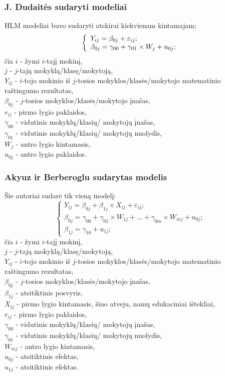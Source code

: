 \documentclass[utf8,hyperref={unicode,pdftex}]{beamer}
\begin{document}
\begin{frame}
\frametitle{J. Dudaitės sudaryti modeliai}
HLM modeliai buvo sudaryti atskirai kiekvienam kintamajam:
\[ \left\{
  \begin{array}{l l}
    Y_{ij} = \beta_{0j}+\varepsilon_{ij}; \\
    \beta_{0j} = \gamma_{00} + \gamma_{01}\times W_{j}+u_{0j};
  \end{array} \right.\]
\small
čia $i$ - žymi $i$-tajį mokinį,\\
$j$ - $j$-tają mokyklą/klasę/mokytoją,\\
$Y_{ij}$ - $i$-tojo mokinio iš $j$-tosios mokyklos/klasės/mokytojo matematinio raštingumo rezultatas,\\
$\beta_{0j}$ - $j$-tosios mokyklos/klasės/mokytojo įnašas,\\
$r_{ij}$ - pirmo lygio paklaidos,\\
$\gamma_{00}$ - vidutinis mokyklų/klasių/ mokytojų įnašas,\\
$\gamma_{01}$ - vidutinis mokyklų/klasių/ mokytojų nuolydis,\\
$W_j$ - antro lygio kintamasis, \\
$u_{0j}$ - antro lygio paklaidos.
\end{frame}

\begin{frame}
\frametitle{Akyuz ir Berberoglu sudarytas modelis}
Šie autoriai sudarė tik vieną modelį:
\[ \left\{
  \begin{array}{l}
    Y_{ij} = \beta_{0j}+\beta_{1j}\times X_{ij}+\varepsilon_{ij}; \\
    \beta_{0j} = \gamma_{00} + \gamma_{01}\times W_{1j}+\dots+\gamma_{0m}\times W_{mj}+u_{0j};\\
    \beta_{1j} = \gamma_{10} + u_{1j};
  \end{array} \right.\]
\small
čia $i$ - žymi $i$-tajį mokinį,\\
$j$ - $j$-tają mokyklą/klasę/mokytoją,\\
$Y_{ij}$ - $i$-tojo mokinio iš $j$-tosios mokyklos/klasės/mokytojo matematinio raštingumo rezultatas,\\
$\beta_{0j}$ - $j$-tosios mokyklos/klasės/mokytojo įnašas,\\
$\beta_{1j}$ - atsitiktinis posvyris,\\
$X_{ij}$ - pirmo lygio kintamasis, šiuo atveju, namų edukaciniai ištekliai, \\
$r_{ij}$ - pirmo lygio paklaidos,\\
$\gamma_{00}$ - vidutinis mokyklų/klasių/ mokytojų įnašas,\\
$\gamma_{01}$ - vidutinis mokyklų/klasių/ mokytojų nuolydis,\\
$W_{mj}$ - antro lygio kintamasis, \\
$u_{0j}$ - atsitiktinis efektas,\\
$u_{1j}$ - atsitiktinis efektas.
\end{frame}
\end{document}
